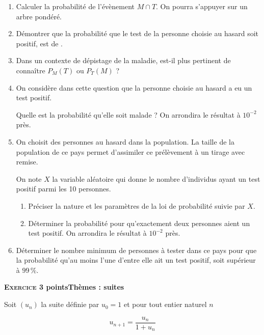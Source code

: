 \documentclass[11pt]{article}
\begin{document}
\begin{enumerate}
\item Calculer la probabilité de l'évènement $M \cap T$. On pourra s'appuyer sur un arbre pondéré.
\item Démontrer que la probabilité que le test  de la personne choisie au hasard soit positif, est de .
\item Dans un contexte de dépistage de la maladie, est-il plus pertinent de connaître $P_M(T)$ ou $P_T(M)$ ?
\item On considère dans cette question que la personne choisie au hasard a eu un test positif.

Quelle est la probabilité qu'elle soit malade ? On arrondira le résultat à $10^{-2}$ près.
\item On choisit des personnes au hasard dans la population. La taille de la population de ce pays permet d'assimiler ce prélèvement à un tirage avec remise.

On note $X$ la variable aléatoire qui donne le nombre d'individus ayant un test positif parmi les 10 personnes. 
	\begin{enumerate}
		\item Préciser la nature et les paramètres de la loi de probabilité suivie par $X$.
		\item Déterminer la probabilité pour qu'exactement deux personnes aient un test positif. On arrondira le résultat à $10^{-2}$ près.
	\end{enumerate}	
\item Déterminer le nombre minimum de personnes à tester dans ce pays pour que la probabilité qu'au moins l'une d'entre elle ait un test positif, soit supérieur à $99\,\%$.
\end{enumerate}

\bigskip

\textbf{\textsc{Exercice 3}   points\hfill Thèmes : suites}

\medskip

Soit $\left(u_n\right)$ la suite définie par $u_0 = 1$ et pour tout entier naturel $n$

\[u_{n+1} = \dfrac{u_n}{1 + u_n}\]
\end{document}
